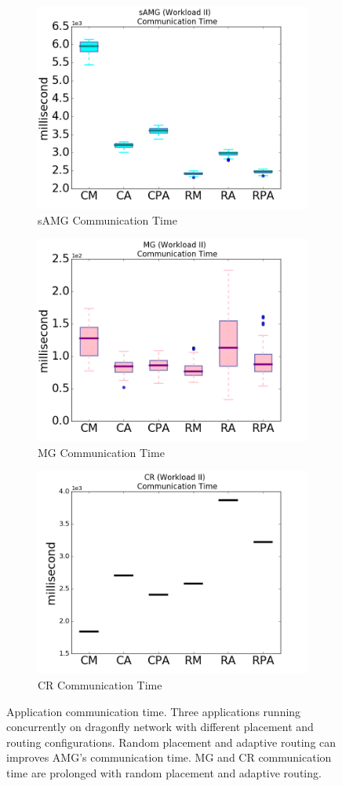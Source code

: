 \documentclass[conference,compsoc]{IEEEtran}
\begin{document}
\begin{figure}[t!]
    \centering
    \begin{subfigure}[t]{0.32\textwidth}
        \centering
        \includegraphics[height=1.5 in]{syn-wkld/amg10/commtime}
        \caption{sAMG Communication Time}
        \label{fig:syn-samg-commtime}
    \end{subfigure}%
    \hspace{1em}%
    \begin{subfigure}[t]{0.32\textwidth}
        \centering
        \includegraphics[height=1.5 in]{syn-wkld/mg/commtime}
        \caption{MG Communication Time}
        \label{fig:syn-mg-commtime}
    \end{subfigure}%
    \begin{subfigure}[t]{0.32\textwidth}
        \centering
        \includegraphics[height=1.5 in]{syn-wkld/cr/commtime}
        \caption{CR Communication Time}
        \label{fig:syn-cr-commtime}
    \end{subfigure}%
   \caption{Application communication time. Three applications running concurrently on dragonfly network with different placement and routing configurations. Random placement and adaptive routing can improves AMG's communication time. MG and CR communication time are prolonged with random placement and adaptive routing.}
   \label{fig:syn-apps-commtime}
\end{figure}
\end{document}
